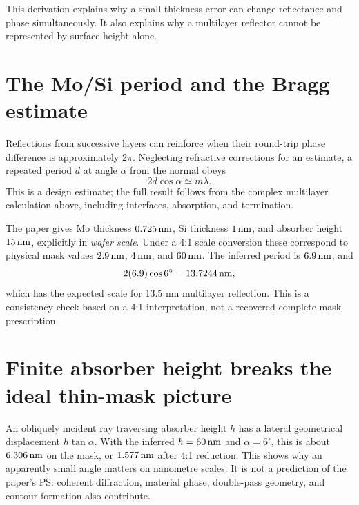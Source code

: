 This derivation explains why a small thickness error can change
reflectance and phase simultaneously. It also explains why a multilayer
reflector cannot be represented by surface height alone.

\section{The Mo/Si period and the Bragg estimate}
Reflections from successive layers can reinforce when their round-trip
phase difference is approximately $2\pi$. Neglecting refractive
corrections for an estimate, a repeated period $d$ at angle $\alpha$
from the normal obeys
\begin{equation}
2d\cos\alpha\simeq m\lambda.
\label{eq:bragg}
\end{equation}
This is a design estimate; the full result follows from the complex
multilayer calculation above, including interfaces, absorption, and
termination.

The paper gives Mo thickness $0.725\,\mathrm{nm}$, Si thickness $1\,\mathrm{nm}$, and
absorber height $15\,\mathrm{nm}$, explicitly in \emph{wafer scale}. Under a 4:1
scale conversion these correspond to physical mask values
$2.9\,\mathrm{nm}$, $4\,\mathrm{nm}$, and $60\,\mathrm{nm}$.
The inferred period is $6.9\,\mathrm{nm}$, and
\[
2(6.9)\cos6^\circ=13.7244\,\mathrm{nm},
\]
which has the expected scale for 13.5 nm multilayer reflection.
This is a consistency check based on a 4:1 interpretation, not a
recovered complete mask prescription.


\section{Finite absorber height breaks the ideal thin-mask picture}
An obliquely incident ray traversing absorber height $h$ has a lateral
geometrical displacement $h\tan\alpha$. With the inferred
$h=60\,\mathrm{nm}$ and $\alpha=6^\circ$, this is about $6.306\,\mathrm{nm}$ on the mask,
or $1.577\,\mathrm{nm}$ after 4:1 reduction.
This shows why an apparently small angle matters on nanometre scales.
It is not a prediction of the paper's PS: coherent diffraction, material
phase, double-pass geometry, and contour formation also contribute.

